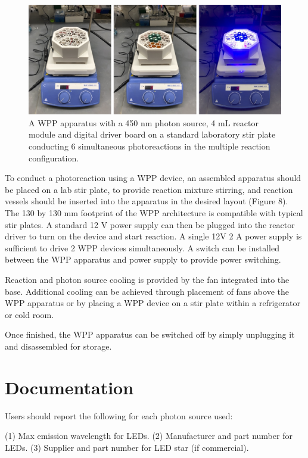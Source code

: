 \documentclass[11pt]{article}
\let\stdsection\section
\renewcommand\section{\clearpage\stdsection}
\begin{document}
\begin{figure}[H]
  \centering
  \includegraphics[width=\textwidth]{"./fign8.png"}
  \caption{A WPP apparatus with a 450 nm photon source, 4 mL reactor module and digital driver board on a standard laboratory stir plate conducting 6 simultaneous photoreactions in the multiple reaction configuration.}
\end{figure}

To conduct a photoreaction using a WPP device, an assembled apparatus should be placed on a lab stir plate, to provide reaction mixture stirring, and reaction vessels should be inserted into the apparatus in the desired layout (Figure 8).
The 130 by 130 mm footprint of the WPP architecture is compatible with typical stir plates.
A standard 12 V power supply can then be plugged into the reactor driver to turn on the device and start reaction.
A single 12V 2 A power supply is sufficient to drive 2 WPP devices simultaneously.
A switch can be installed between the WPP apparatus and power supply to provide power switching.

Reaction and photon source cooling is provided by the fan integrated into the base.
Additional cooling can be achieved through placement of fans above the WPP apparatus or by placing a WPP device on a stir plate within a refrigerator or cold room.

Once finished, the WPP apparatus can be switched off by simply unplugging it and disassembled for storage.

\section{Documentation}

Users should report the following for each photon source used:

    (1) Max emission wavelength for LEDs.
    (2) Manufacturer and part number for LEDs.
    (3) Supplier and part number for LED star (if commercial).
\end{document}
